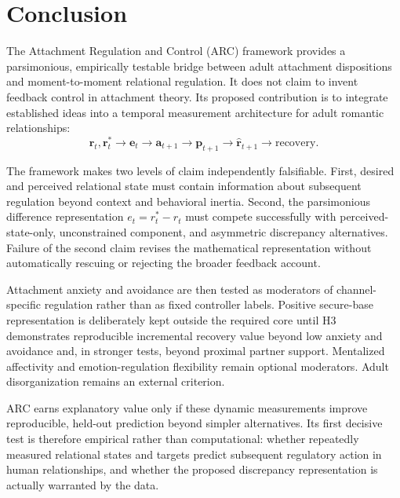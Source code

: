 \section{Conclusion}

The Attachment Regulation and Control (ARC) framework provides a parsimonious, empirically testable bridge between adult attachment dispositions and moment-to-moment relational regulation. It does not claim to invent feedback control in attachment theory. Its proposed contribution is to integrate established ideas into a temporal measurement architecture for adult romantic relationships:
\[
\hat{\mathbf r}_t,\mathbf r^\ast_t
\rightarrow
\mathbf e_t
\rightarrow
\mathbf a_{t+1}
\rightarrow
\mathbf p_{t+1}
\rightarrow
\hat{\mathbf r}_{t+1}
\rightarrow
\mathrm{recovery}.
\]

The framework makes two levels of claim independently falsifiable. First, desired and perceived relational state must contain information about subsequent regulation beyond context and behavioral inertia. Second, the parsimonious difference representation \(e_t=r^\ast_t-\hat r_t\) must compete successfully with perceived-state-only, unconstrained component, and asymmetric discrepancy alternatives. Failure of the second claim revises the mathematical representation without automatically rescuing or rejecting the broader feedback account.

Attachment anxiety and avoidance are then tested as moderators of channel-specific regulation rather than as fixed controller labels. Positive secure-base representation is deliberately kept outside the required core until H3 demonstrates reproducible incremental recovery value beyond low anxiety and avoidance and, in stronger tests, beyond proximal partner support. Mentalized affectivity and emotion-regulation flexibility remain optional moderators. Adult disorganization remains an external criterion.

ARC earns explanatory value only if these dynamic measurements improve reproducible, held-out prediction beyond simpler alternatives. Its first decisive test is therefore empirical rather than computational: whether repeatedly measured relational states and targets predict subsequent regulatory action in human relationships, and whether the proposed discrepancy representation is actually warranted by the data.
